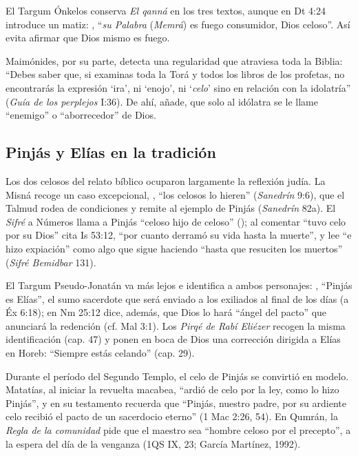El Targum Ónkelos conserva \emph{El qanná} en los tres textos, aunque en Dt 4:24 introduce un matiz: , ``\emph{su Palabra} (\emph{Memrá}) es fuego consumidor, Dios celoso''. Así evita afirmar que Dios mismo es fuego.

Maimónides, por su parte, detecta una regularidad que atraviesa toda la Biblia: ``Debes saber que, si examinas toda la Torá y todos los libros de los profetas, no encontrarás la expresión `ira', ni `enojo', ni `\emph{celo}' sino en relación con la idolatría'' (\emph{Guía de los perplejos} I:36). De ahí, añade, que solo al idólatra se le llame ``enemigo'' o ``aborrecedor'' de Dios.


\subsection{Pinjás y Elías en la tradición}
Los dos celosos del relato bíblico ocuparon largamente la reflexión judía. La Misná recoge un caso excepcional, , ``los celosos lo hieren'' (\emph{Sanedrín} 9:6), que el Talmud rodea de condiciones y remite al ejemplo de Pinjás (\emph{Sanedrín} 82a). El \emph{Sifré} a Números llama a Pinjás ``celoso hijo de celoso'' (); al comentar ``tuvo celo por su Dios'' cita Is 53:12, ``por cuanto derramó su vida hasta la muerte'', y lee ``e hizo expiación'' como algo que sigue haciendo ``hasta que resuciten los muertos'' (\emph{Sifré Bemidbar} 131).

El Targum Pseudo-Jonatán va más lejos e identifica a ambos personajes: , ``Pinjás es Elías'', el sumo sacerdote que será enviado a los exiliados al final de los días (a Éx 6:18); en Nm 25:12 dice, además, que Dios lo hará ``ángel del pacto'' que anunciará la redención (cf. Mal 3:1). Los \emph{Pirqé de Rabí Eliézer} recogen la misma identificación (cap. 47) y ponen en boca de Dios una corrección dirigida a Elías en Horeb: ``Siempre estás celando'' (cap. 29).

Durante el período del Segundo Templo, el celo de Pinjás se convirtió en modelo. Matatías, al iniciar la revuelta macabea, ``ardió de celo por la ley, como lo hizo Pinjás'', y en su testamento recuerda que ``Pinjás, nuestro padre, por su ardiente celo recibió el pacto de un sacerdocio eterno'' (1 Mac 2:26, 54). En Qumrán, la \emph{Regla de la comunidad} pide que el maestro sea ``hombre celoso por el precepto'', a la espera del día de la venganza (1QS IX, 23; García Martínez, 1992).

